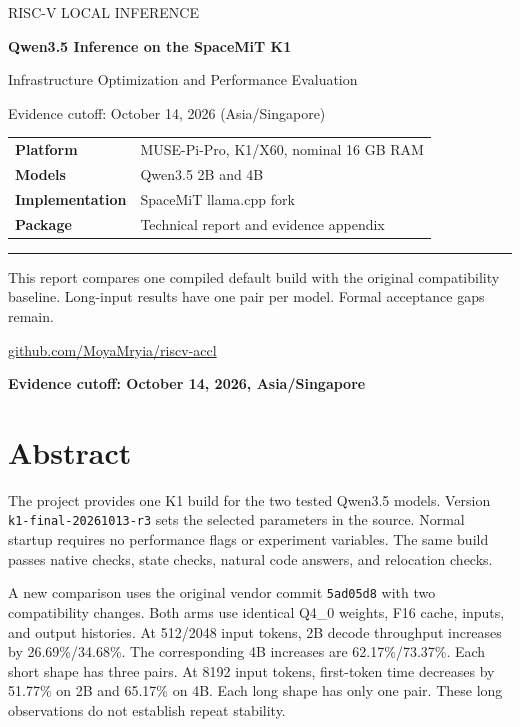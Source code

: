 \documentclass[10pt,a4paper]{article}
\begin{document}
\begin{titlepage}
\vspace*{15mm}
{\large\textcolor{reportblue}{RISC-V LOCAL INFERENCE}}\par
\vspace{12mm}
{\Huge\bfseries Qwen3.5 Inference on the SpaceMiT K1\par}
\vspace{8mm}
{\Large Infrastructure Optimization and Performance Evaluation\par}
\vspace{12mm}
{\large Evidence cutoff: October 14, 2026 (Asia/Singapore)\par}
\vspace{14mm}
\begin{tabular}{@{}ll@{}}
\textbf{Platform} & MUSE-Pi-Pro, K1/X60, nominal 16 GB RAM \\
\textbf{Models} & Qwen3.5 2B and 4B \\
\textbf{Implementation} & SpaceMiT llama.cpp fork \\
\textbf{Package} & Technical report and evidence appendix \\
\end{tabular}
\vfill
\textcolor{reportblue}{\rule{\textwidth}{1pt}}\par
This report compares one compiled default build with the original compatibility baseline.
Long-input results have one pair per model. Formal acceptance gaps remain.\par
\vspace{6mm}
\href{https://github.com/MoyaMryia/riscv-accl}{github.com/MoyaMryia/riscv-accl}
\end{titlepage}
{\small\tableofcontents}
\clearpage
\textbf{Evidence cutoff: October 14, 2026, Asia/Singapore}

\hypertarget{abstract}{%
\section{Abstract}\label{abstract}}

The project provides one K1 build for the two tested Qwen3.5 models.
Version \nolinkurl{k1-final-20261013-r3} sets the selected parameters in
the source. Normal startup requires no performance flags or experiment
variables. The same build passes native checks, state checks, natural
code answers, and relocation checks.

A new comparison uses the original vendor commit \nolinkurl{5ad05d8}
with two compatibility changes. Both arms use identical Q4\_0 weights,
F16 cache, inputs, and output histories. At 512/2048 input tokens, 2B
decode throughput increases by 26.69\%/34.68\%. The corresponding 4B
increases are 62.17\%/73.37\%. Each short shape has three pairs. At 8192
input tokens, first-token time decreases by 51.77\% on 2B and 65.17\% on
4B. Each long shape has only one pair. These long observations do not
establish repeat stability.
\end{document}
